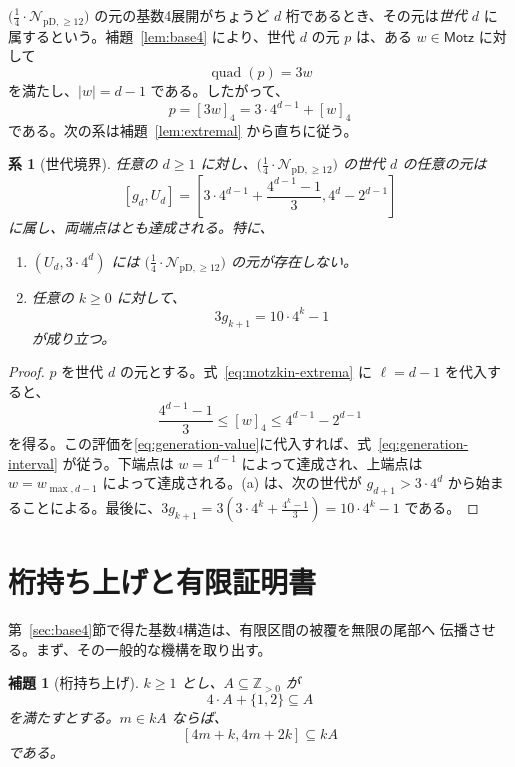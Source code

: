 \documentclass[12pt]{ltjsarticle}
\theoremstyle{plain}
\newtheorem{lemma}[theorem]{補題}
\newtheorem{corollary}[theorem]{系}
\theoremstyle{definition}
\theoremstyle{plain}
\newcommand{\Pset}{%
  \bigl(\tfrac{1}{4}\cdot\mathcal{N}_{\mathrm{pD},\geq 12}\bigr)%
}
\begin{document}
$\Pset$ の元の基数4展開がちょうど $d$ 桁であるとき、その元は\emph{世代 $d$} に
属するという。補題~\ref{lem:base4} により、世代 $d$ の元 $p$ は、ある
$w\in\mathsf{Motz}$ に対して
\[
 \operatorname{quad}(p)=3w
\]
を満たし、$|w|=d-1$ である。したがって、
\begin{equation}\label{eq:generation-value}
 p=[3w]_4=3\cdot4^{d-1}+[w]_4
\end{equation}
である。次の系は補題~\ref{lem:extremal} から直ちに従う。

\begin{corollary}[世代境界]\label{cor:gen}
任意の $d\geq1$ に対し、$\Pset$ の世代 $d$ の任意の元は
\begin{equation}\label{eq:generation-interval}
  [g_d,U_d]
  =\left[
  3\cdot4^{d-1}+\frac{4^{d-1}-1}{3},
  4^d-2^{d-1}
  \right]
\end{equation}
に属し、両端点はとも達成される。特に、
\begin{enumerate}[label=\textup{(\alph*)}]
\item $(U_d,3\cdot4^d)$ には $\Pset$ の元が存在しない。
\item 任意の $k\geq0$ に対して、
\begin{equation}\label{eq:three-g}
  3g_{k+1}=10\cdot4^k-1
\end{equation}
が成り立つ。
\end{enumerate}
\end{corollary}

\begin{proof}
$p$ を世代 $d$ の元とする。式~\eqref{eq:motzkin-extrema} に $\ell=d-1$ を代入すると、
\[
 \frac{4^{d-1}-1}{3}
 \leq[w]_4
 \leq4^{d-1}-2^{d-1}
\]
を得る。この評価を\eqref{eq:generation-value}に代入すれば、式~\eqref{eq:generation-interval}
が従う。下端点は $w=1^{d-1}$ によって達成され、上端点は
$w=w_{\max,d-1}$ によって達成される。(a) は、次の世代が
$g_{d+1}>3\cdot4^d$ から始まることによる。最後に、$  3g_{k+1}
  =3\left(3\cdot4^k+\frac{4^k-1}{3}\right)
  =10\cdot4^k-1$
である。
\end{proof}

\section{桁持ち上げと有限証明書}\label{sec:lifting}

第~\ref{sec:base4}節で得た基数4構造は、有限区間の被覆を無限の尾部へ
伝播させる。まず、その一般的な機構を取り出す。

\begin{lemma}[桁持ち上げ]\label{lem:digit-lifting}
$k\geq1$ とし、$A\subseteq\mathbb Z_{>0}$ が
\begin{equation}\label{eq:digit-closure}
 4\cdot A+\{1,2\}\subseteq A
\end{equation}
を満たすとする。$m\in kA$ ならば、
\begin{equation}\label{eq:digit-lifting}
 [4m+k,4m+2k]\subseteq kA
\end{equation}
である。
\end{lemma}
\end{document}
